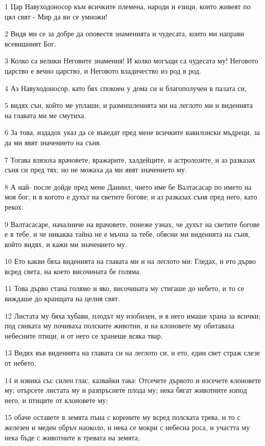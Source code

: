 \par 1 Цар Навуходоносор към всичките племена, народи и езици, които живеят по цял свят - Мир да ви се умножи!
\par 2 Видя ми се за добре да оповестя знаменията и чудесата, които ми направи всевишният Бог.
\par 3 Колко са велики Неговите знамения! И колко могъщи са чудесата му! Неговото царство е вечно царство, и Неговото владичество из род в род.
\par 4 Аз Навуходоносор, като бях спокоен у дома си и благополучен в палата си,
\par 5 видях сън, който ме уплаши; и размишленията ми на леглото ми и виденията на главата ми ме смутиха.
\par 6 За това, издадох указ да се въведат пред мене всичките вавилонски мъдреци, за да ми явят значението на съня.
\par 7 Тогава влязоха врачовете, вражарите, халдейците, и астролозите, и аз разказах съня си пред тях; но не можаха да ми явят значението му.
\par 8 А най- после дойде пред мене Даниил, чието име бе Валтасасар по името на моя бог, и в когото е духът на светите богове; и аз разказах съня пред него, като рекох:
\par 9 Валтасасаре, началниче на врачовете, понеже узнах, че духът на светите богове е в тебе, и че никаква тайна не е мъчна за тебе, обясни ми виденията на съня, който видях, и кажи ми значението му.
\par 10 Ето какви бяха виденията на главата ми и на леглото ми: Гледах, и ето дърво всред света, на което височината бе голяма.
\par 11 Това дърво стана голямо и яко, височината му стигаше до небето, и то се виждаше до краищата на целия свят.
\par 12 Листата му бяха хубави, плодът му изобилен, и в него имаше храна за всички; под сянката му почиваха полските животни, и на клоновете му обитаваха небесните птици, и от него се хранеше всяка твар.
\par 13 Видях във виденията на главата си на леглото си, и ето, един свет страж слезе от небето,
\par 14 и извика със силен глас, казвайки така: Отсечете дървото и изсечете клоновете му; отърсете листата му и разпръснете плода му; нека бягат животните изпод него, и птиците от клоновете му;
\par 15 обаче оставете в земята пъна с корените му всред полската трева, и то с железен и меден обръч наоколо, и нека се мокри с небесна роса, и участта му нека бъде с животните в тревата на земята;
